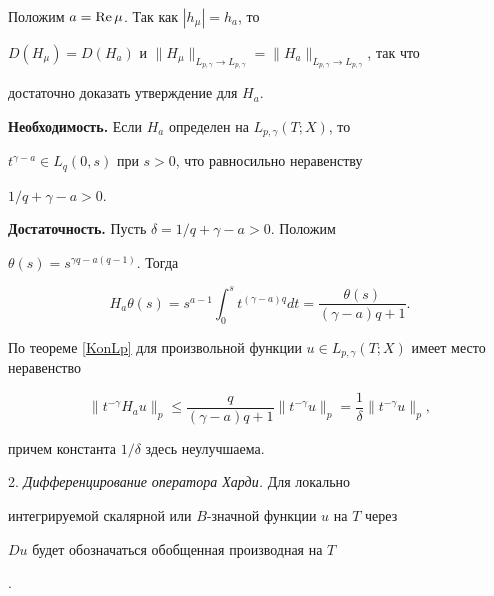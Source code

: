 \begin{pf}


Положим $a=\operatorname{Re} \mu$. Так как $|h_\mu|=h_a$, то


$D(H_\mu)=D(H_a)$ и $\|H_\mu\|_{L_{p,\gamma} \to


L_{p,\gamma}}=\|H_a\|_{L_{p,\gamma} \to L_{p,\gamma}}$, так что


достаточно доказать утверждение для $H_a$.


\smallskip





{\bf Необходимость.} Если $H_a$ определен на $L_{p,\gamma}(T;X)$, то


$t^{\gamma-a} \in L_q(0,s)$ при $s>0$, что равносильно неравенству


$1/q+\gamma-a>0$.


\smallskip





{\bf Достаточность.} Пусть $\delta =1/q+\gamma-a >0$. Положим


$\theta(s)=s^{\gamma q-a(q-1)}$. Тогда


$$


H_a\theta(s)=s^{a-1} \int_0^s t^{(\gamma-a)q} d t


=\frac{\theta(s)}{(\gamma-a)q+1}.


$$


По теореме \ref{KonLp} для произвольной функции $u \in


L_{p,\gamma}(T;X)$ имеет место неравенство


$$


\|t^{-\gamma} H_a u \|_p \le \frac{q}{(\gamma-a)q+1}


\|t^{-\gamma}u\|_p = \frac{1}{\delta} \|t^{-\gamma}u\|_p,


$$


причем константа $1/\delta$ здесь неулучшаема.


\end{pf}





2. {\it Дифференцирование оператора Харди.} Для локально


интегрируемой скалярной или $B$-значной функции $u$ на $T$ через


$D u$ будет обозначаться обобщенная производная на $T$


\cite{Adams}.





